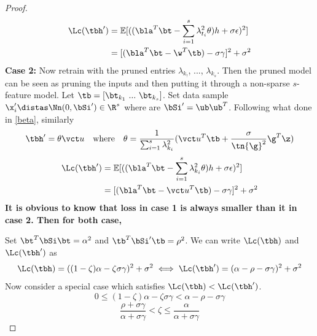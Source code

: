 {\begin{proof}
\[\]
\begin{align}
    \Lc(\tbh')&=\mathbb{E}[((\bla^T\bt-\sum_{i=1}^s\lambda_{t_i}^2\theta)h+\sigma\epsilon)^2]\\
    &=[(\bla^T\bt-\w^T\tb)-\sigma\gamma]^2+\sigma^2
\end{align}
\textbf{Case 2: }
Now retrain with the pruned entries $\lambda_{k_!}$, ..., $\lambda_{k_s}$. Then the pruned model can be seen as pruning the inputs and then putting it through a non-sparse $s$-feature model. Let $\tb=[\bt_{k_1}~...~\bt_{k_s}]$. Set data sample $\x_i'\distas \Nn(0,\bSi')\in\R^s$ where are $\bSi'=\ub\ub^T$. Following what done in \ref{beta}, similarly
\[
\tbh'=\theta\vct u\quad\text{where}\quad\theta=\frac{1}{\sum_{i=1}^s\lambda_{k_i}^2}(\vct u^T\tb+\frac{\sigma}{\tn{\g}^2}\g^T\z)
\]
\begin{align}
    \Lc(\tbh')&=\mathbb{E}[((\bla^T\bt-\sum_{i=1}^s\lambda_{k_i}^2\theta)h+\sigma\epsilon)^2]\\
    &=[(\bla^T\bt-\vct u^T\tb)-\sigma\gamma]^2+\sigma^2
\end{align}
\textbf{It is obvious to know that loss in case 1 is always smaller than it in case 2. Then for both case, }

Set $\bt^T\bSi\bt=\alpha^2$ and $\tb^T\bSi'\tb=\rho^2$. We can write $\Lc(\tbh)$ and $\Lc(\tbh')$ as
\[
\Lc(\tbh)=((1-\zeta)\alpha-\zeta\sigma\gamma)^2+\sigma^2\iff\Lc(\tbh')=(\alpha-\rho-\sigma\gamma)^2+\sigma^2
\]
Now consider a special case which satisfies $\Lc(\tbh)<\Lc(\tbh')$.
\[
0\leq(1-\zeta)\alpha-\zeta\sigma\gamma<\alpha-\rho-\sigma\gamma
\]
\[
\frac{\rho+\sigma\gamma}{\alpha+\sigma\gamma}<\zeta\leq\frac{\alpha}{\alpha+\sigma\gamma}
\]
\end{proof}}

